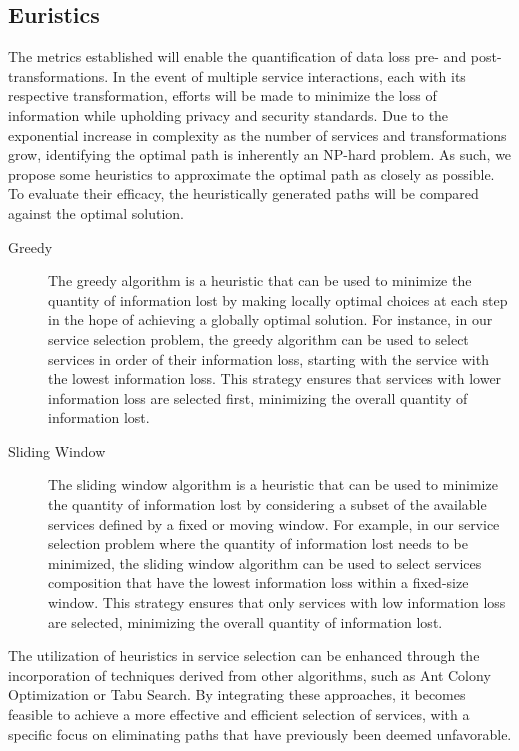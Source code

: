 \subsection{Euristics}
The metrics established will enable the quantification of data loss pre- and post-transformations.
In the event of multiple service interactions, each with its respective transformation, efforts will be made to minimize the loss of information while upholding privacy and security standards.
Due to the exponential increase in complexity as the number of services and transformations grow, identifying the optimal path is inherently an NP-hard problem.
As such, we propose some heuristics to approximate the optimal path as closely as possible. To evaluate their efficacy, the heuristically generated paths will be compared against the optimal solution.
\begin{description}
    \item[Greedy] The greedy algorithm is a heuristic that can be used to minimize the quantity of information lost by making locally optimal choices at each step in the hope of achieving a globally optimal solution.
        For instance, in our service selection problem, the greedy algorithm can be used to select services in order of their information loss, starting with the service with the lowest information loss.
        This strategy ensures that services with lower information loss are selected first, minimizing the overall quantity of information lost.
    \item[Sliding Window] The sliding window algorithm is a heuristic that can be used to minimize the quantity of information lost by considering a subset of the available services defined by a fixed or moving window.
        For example, in our service selection problem where the quantity of information lost needs to be minimized, the sliding window algorithm can be used to select services composition that have the lowest information loss within a fixed-size window.
        This strategy ensures that only services with low information loss are selected, minimizing the overall quantity of information lost.
\end{description}
The utilization of heuristics in service selection can be enhanced through the incorporation of techniques derived from other algorithms, such as Ant Colony Optimization or Tabu Search.
By integrating these approaches, it becomes feasible to achieve a more effective and efficient selection of services, with a specific focus on eliminating paths that have previously been deemed unfavorable.
